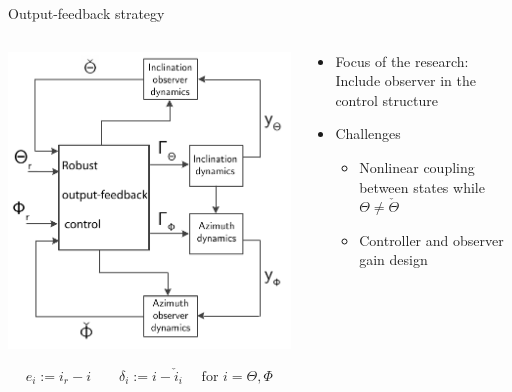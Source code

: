 \documentclass[10pt]{beamer}
\begin{document}
\begin{frame}{Output-feedback strategy}
	\begin{columns}
		\hspace{1cm}\begin{column}{0.5\textwidth}
			\includegraphics[width=1.1\textwidth]{images/ControlStrategyRobust.pdf}
			
			\footnotesize \begin{equation*}
						e_i := i_{r} - i \qquad \delta_i := i - \check{i}_i \quad \text{ for } i=\Theta,\Phi
			\end{equation*}
		\end{column}
		\begin{column}{0.5\textwidth}
			\begin{itemize}\setlength\itemsep{2.5em}
				\item Focus of the research: Include observer in the control structure
				\item Challenges
					\begin{itemize}
						\item  Nonlinear coupling between states while $\Theta \ne \check{\Theta}$
						\item  Controller and observer gain design
					\end{itemize}
			\end{itemize}
		\end{column}
	\end{columns}
\end{frame}
\end{document}
